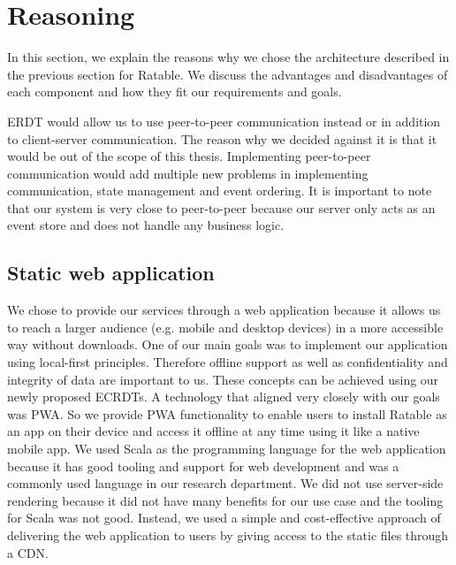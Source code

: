 \documentclass[
	ngerman,
	ruledheaders=section,   %
	class=report,		    %
	thesis={type=bachelor}, %
	accentcolor=9c,			%
	custommargins=true,    %
	marginpar=false,        %
	parskip=half-,          %
	fontsize=11pt,          %
]{tudapub}
\begin{document}
\section{Reasoning}
In this section, we explain the reasons why we chose the architecture described in the previous section for Ratable. We discuss the advantages and disadvantages of each component and how they fit our requirements and goals.

ERDT would allow us to use peer-to-peer communication instead or in addition to client-server communication. The reason why we decided against it is that it would be out of the scope of this thesis. Implementing peer-to-peer communication would add multiple new problems in implementing communication, state management and event ordering. It is important to note that our system is very close to peer-to-peer because our server only acts as an event store and does not handle any business logic.

\subsection{Static web application}
We chose to provide our services through a web application because it allows us to reach a larger audience (e.g. mobile and desktop devices) in a more accessible way without downloads. One of our main goals was to implement our application using local-first principles. Therefore offline support as well as confidentiality and integrity of data are important to us. These concepts can be achieved using our newly proposed ECRDTs. A technology that aligned very closely with our goals was PWA. So we provide PWA functionality to enable users to install Ratable as an app on their device and access it offline at any time using it like a native mobile app. We used Scala as the programming language for the web application because it has good tooling and support for web development and was a commonly used language in our research department. We did not use server-side rendering because it did not have many benefits for our use case and the tooling for Scala was not good. Instead, we used a simple and cost-effective approach of delivering the web application to users by giving access to the static files through a CDN.
\end{document}
